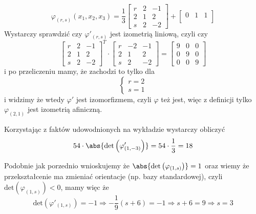 \documentclass[11pt]{scrartcl}
\begin{document}
        \begin{walk}
            \item 
              \[
                \varphi_{(r,s)} (x_1, x_2, x_3 ) = \frac{1}{3} 
                \begin{bmatrix}
                  r & 2 & -1 \\
                  2  & 1 & 2 \\
                  s & 2 & -2
                \end{bmatrix}
                + 
                \begin{bmatrix}
                  0 & 1 & 1 \\
                \end{bmatrix}
              \]
              Wystarczy sprawdzić czy $\varphi'_{(r,s)}$ jest izometrią liniową, czyli czy
              \[
                 \begin{bmatrix}
                   r & 2 & -1 \\
                   2  & 1 & 2 \\
                   s & 2 & -2
                 \end{bmatrix}^T
                 \cdot 
                 \begin{bmatrix}
                   r & -2 & -1 \\
                   2 & 1 & 2  \\
                   s & 2 & -2
                 \end{bmatrix}
                 =
                 \begin{bmatrix}
                   9 & 0 & 0 \\
                   0 & 9 & 0  \\
                   0 & 0 & 9
                 \end{bmatrix}
              \]
              i po przeliczeniu mamy, że zachodzi to tylko dla 
              \[
                  \begin{cases}
                      r = 2 \\
                      s = 1
                  \end{cases}
              \]
              i widzimy że wtedy $\varphi'$ jest izomorfizmem, czyli $\varphi$ też jest, więc z definicji tylko  $\varphi_{(2,1)}$ jest izometrią afiniczną.
            \item Korzystając z faktów udowodnionych na wykładzie wystarczy obliczyć
              \[
                54 \cdot \abs{\text{det}\left ( \varphi'_{(1,-3)} \right )} = 54 \cdot \frac{1}{3} = 18 
              \]
            \item Podobnie jak porzednio wnioskujemy że $\abs{\text{det}\left ( \varphi_{(1,s)} \right )} = 1 $ oraz wiemy że przekształcenie ma zmieniać orientacje (np. bazy standardowej), czyli $\text{det}\left ( \varphi_{(1,s)} \right ) < 0$, mamy więc że 
              \[
                \text{det} \left ( \varphi'_{(1,s)} \right ) = -1 \Rightarrow -\frac{1}{9} \left ( s+6 \right ) = -1 \Rightarrow s + 6 = 9 \Rightarrow s = 3
              \]
              
        \end{walk}
        
\end{document}
